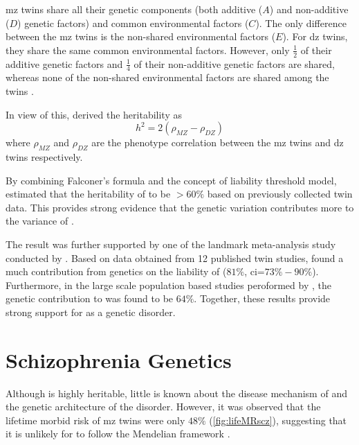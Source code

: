 	\gls{mz} twins share all their genetic components (both additive ($A$) and non-additive ($D$) genetic factors) and common environmental factors ($C$).
	The only difference between the \gls{mz} twins is the non-shared environmental factors ($E$).
	For \gls{dz} twins, they share the same common environmental factors.
	However, only $\frac{1}{2}$ of their additive genetic factors and $\frac{1}{4}$ of their non-additive genetic factors are shared, whereas none of the non-shared environmental factors are shared among the twins \citep{Rijsdijk2002}.
	
	In view of this, \cite{Falconer1996} derived the heritability as
	\begin{equation}
	h^2 = 2(\rho_{MZ}-\rho_{DZ})
	\end{equation}
	where $\rho_{MZ}$ and $\rho_{DZ}$ are the phenotype correlation between the \gls{mz} twins and \gls{dz} twins respectively.
	
	By combining Falconer's formula and the concept of liability threshold model, \citet{Gottesman1967} estimated that the heritability of  to be $>60\%$ based on previously collected twin data.
	This provides strong evidence that the genetic variation contributes more to the variance of .
	
	The result was further supported by one of the landmark meta-analysis study conducted by \citet{Sullivan2003}.
	Based on data obtained from 12 published  twin studies, \citet{Sullivan2003} found a much contribution from genetics on the liability of  ($81\%$, \gls{ci}=$73\%-90\%$).
	Furthermore, in the large scale population based studies peroformed by \citet{Lichtenstein2009}, the genetic contribution to  was found to be $64\%$.
	Together, these results provide strong support for  as a genetic disorder. 
	
	\section{Schizophrenia Genetics}
	Although  is highly heritable, little is known about the disease mechanism of  and the genetic architecture of the disorder. 
	However, it was observed that the lifetime morbid risk of \gls{mz} twins were only $48\%$ (\cref{fig:lifeMRscz}), suggesting that it is unlikely for  to follow the Mendelian framework \citep{Gottesman1967,Gottesman1982,gottesman1991schizophrenia}.
	
